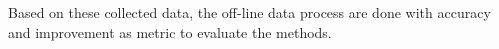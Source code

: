 

Based on these collected data, the off-line data process are done with accuracy and improvement as metric to evaluate the methods.  
%

